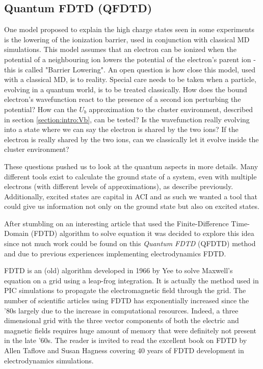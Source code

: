 \subsection{Quantum FDTD (QFDTD)}
\label{section:tools:qfdtd}


One model proposed to explain the high charge states seen in some experiments
is the lowering of the ionization barrier, used in conjunction with classical
MD simulations. This model assumes that an electron can be ionized when
the potential of a neighbouring ion lowers the potential of the electron's
parent ion - this is called "Barrier Lowering". 
%
An open question is how close this model, used
with a classical MD, is to reality. Special care needs to be taken when a
particle, evolving in a quantum world, is to be treated classically.
How does
the bound electron's wavefunction react to the presence of a second ion
perturbing the potential? How can the $U_b$ approximation to the cluster
environment, described in section \ref{section:intro:Vb}, can be tested?
Is the wavefunction really evolving into a state
where we can say the electron is shared by the two ions? If the electron is
really shared by the two ions, can we classically let it evolve inside the
cluster environment?

These questions pushed us to look at the quantum aspects in more details. Many
different tools exist to calculate the ground state of a system, even with
multiple electrons (with different levels of approximations),
as describe previously. Additionally, excited states are
capital in ACI and as such we wanted a tool that could give us information not
only on the ground state but also on excited states.

After stumbling on an interesting article that used the Finite-Difference
Time-Domain (FDTD) algorithm to solve \schrodinger equation\cite{Sudiarta2007}
it was decided to explore this idea since not much work could be found on this
\textit{Quantum FDTD} (QFDTD) method and due to previous experiences
implementing electrodynamics FDTD.

FDTD is an (old) algorithm developed in 1966 by Yee\cite{Yee1966} to solve
Maxwell's equation on a grid using a leap-frog integration.
It is actually the method used in PIC simulations to propagate the electromagnetic
field through the grid.
The number of
scientific articles using FDTD has exponentially increased since the '80s
largely due to the increase in computational resources. Indeed, a three
dimensional grid with the three vector components of both the electric and
magnetic fields requires huge amount of memory that were definitely not present
in the late '60s. The reader is invited to read the excellent book on FDTD by
Allen Taflove and Susan Hagness\cite{Taflove2005} covering 40 years of FDTD
development in electrodynamics simulations.

